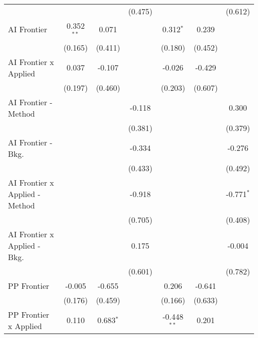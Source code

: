 \begin{tabular}{lcccccc}
                                  &               &              & (0.475)       &               &               & (0.612)\\   
   AI Frontier                    & 0.352$^{**}$  & 0.071        &               & 0.312$^{*}$   & 0.239         &   \\   
                                  & (0.165)       & (0.411)      &               & (0.180)       & (0.452)       &   \\   
   AI Frontier x Applied          & 0.037         & -0.107       &               & -0.026        & -0.429        &   \\   
                                  & (0.197)       & (0.460)      &               & (0.203)       & (0.607)       &   \\   
   AI Frontier - Method           &               &              & -0.118        &               &               & 0.300\\   
                                  &               &              & (0.381)       &               &               & (0.379)\\   
   AI Frontier - Bkg.             &               &              & -0.334        &               &               & -0.276\\   
                                  &               &              & (0.433)       &               &               & (0.492)\\   
   AI Frontier x Applied - Method &               &              & -0.918        &               &               & -0.771$^{*}$\\   
                                  &               &              & (0.705)       &               &               & (0.408)\\   
   AI Frontier x Applied - Bkg.   &               &              & 0.175         &               &               & -0.004\\   
                                  &               &              & (0.601)       &               &               & (0.782)\\   
   PP Frontier                    & -0.005        & -0.655       &               & 0.206         & -0.641        &   \\   
                                  & (0.176)       & (0.459)      &               & (0.166)       & (0.633)       &   \\   
   PP Frontier x Applied          & 0.110         & 0.683$^{*}$  &               & -0.448$^{**}$ & 0.201         &   \\   

\end{tabular}
